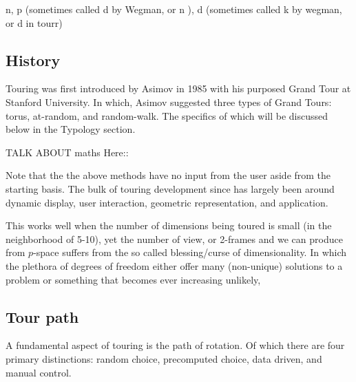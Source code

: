 \documentclass{monashthesis}
\begin{document}
n, p (sometimes called d by Wegman, or n ), d (sometimes called k by wegman, or d in tourr)

\hypertarget{history}{%
\subsection{History}\label{history}}

Touring was first introduced by Asimov in 1985 with his purposed Grand Tour\autocite{asimov_grand_1985} at Stanford University. In which, Asimov suggested three types of Grand Tours: torus, at-random, and random-walk. The specifics of which will be discussed below in the Typology section.

TALK ABOUT maths Here::

Note that the the above methods have no input from the user aside from the starting basis. The bulk of touring development since has largely been around dynamic display, user interaction, geometric representation, and application.

This works well when the number of dimensions being toured is small (in the neighborhood of 5-10), yet the number of view, or 2-frames and we can produce from \(p\)-space suffers from the so called blessing/curse of dimensionality. In which the plethora of degrees of freedom either offer many (non-unique) solutions to a problem or something that becomes ever increasing unlikely,

\hypertarget{tour-path}{%
\subsection{Tour path}\label{tour-path}}

A fundamental aspect of touring is the path of rotation. Of which there are four primary distinctions\autocite{buja_computational_2005}: random choice, precomputed choice, data driven, and manual control.
\end{document}
